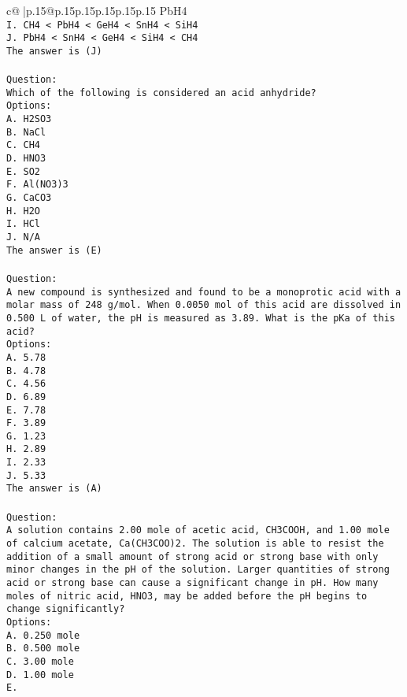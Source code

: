 \documentclass{article}
\begin{document}
{\begin{supertabular}{c@{$\;$}|p{.15\linewidth}@{}p{.15\linewidth}p{.15\linewidth}p{.15\linewidth}p{.15\linewidth}p{.15\linewidth}}
{{{PbH4\\ \tt I. CH4 < PbH4 < GeH4 < SnH4 < SiH4\\ \tt J. PbH4 < SnH4 < GeH4 < SiH4 < CH4\\ \tt The answer is (J)\\ \tt \\ \tt Question:\\ \tt Which of the following is considered an acid anhydride?\\ \tt Options:\\ \tt A. H2SO3\\ \tt B. NaCl\\ \tt C. CH4\\ \tt D. HNO3\\ \tt E. SO2\\ \tt F. Al(NO3)3\\ \tt G. CaCO3\\ \tt H. H2O\\ \tt I. HCl\\ \tt J. N/A\\ \tt The answer is (E)\\ \tt \\ \tt Question:\\ \tt A new compound is synthesized and found to be a monoprotic acid with a molar mass of 248 g/mol. When 0.0050 mol of this acid are dissolved in 0.500 L of water, the pH is measured as 3.89. What is the pKa of this acid?\\ \tt Options:\\ \tt A. 5.78\\ \tt B. 4.78\\ \tt C. 4.56\\ \tt D. 6.89\\ \tt E. 7.78\\ \tt F. 3.89\\ \tt G. 1.23\\ \tt H. 2.89\\ \tt I. 2.33\\ \tt J. 5.33\\ \tt The answer is (A)\\ \tt \\ \tt Question:\\ \tt A solution contains 2.00 mole of acetic acid, CH3COOH, and 1.00 mole of calcium acetate, Ca(CH3COO)2. The solution is able to resist the addition of a small amount of strong acid or strong base with only minor changes in the pH of the solution. Larger quantities of strong acid or strong base can cause a significant change in pH. How many moles of nitric acid, HNO3, may be added before the pH begins to change significantly?\\ \tt Options:\\ \tt A. 0.250 mole\\ \tt B. 0.500 mole\\ \tt C. 3.00 mole\\ \tt D. 1.00 mole\\ \tt E. }}}
\end{supertabular}}
\end{document}
